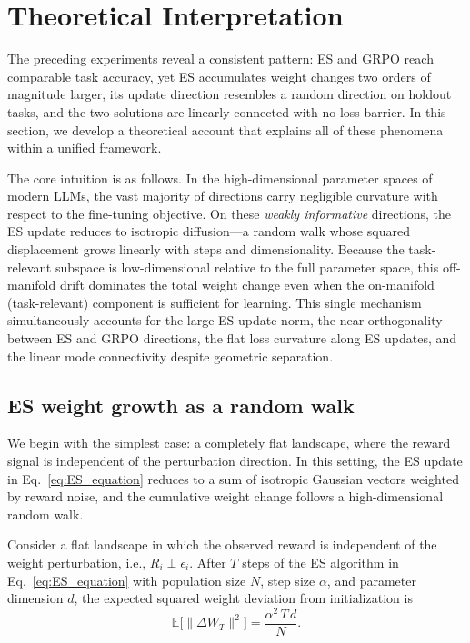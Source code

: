 \section{Theoretical Interpretation}
\label{sec:theory}

The preceding experiments reveal a consistent pattern: ES and GRPO reach comparable task accuracy, yet ES accumulates weight changes two orders of magnitude larger, its update direction resembles a random direction on holdout tasks, and the two solutions are linearly connected with no loss barrier. In this section, we develop a theoretical account that explains all of these phenomena within a unified framework.

The core intuition is as follows. In the high-dimensional parameter spaces of modern LLMs, the vast majority of directions carry negligible curvature with respect to the fine-tuning objective. On these \emph{weakly informative} directions, the ES update reduces to isotropic diffusion—a random walk whose squared displacement grows linearly with steps and dimensionality. Because the task-relevant subspace is low-dimensional relative to the full parameter space, this off-manifold drift dominates the total weight change even when the on-manifold (task-relevant) component is sufficient for learning. This single mechanism simultaneously accounts for the large ES update norm, the near-orthogonality between ES and GRPO directions, the flat loss curvature along ES updates, and the linear mode connectivity despite geometric separation.

\subsection{ES weight growth as a random walk}

We begin with the simplest case: a completely flat landscape, where the reward signal is independent of the perturbation direction. In this setting, the ES update in Eq.~\eqref{eq:ES_equation} reduces to a sum of isotropic Gaussian vectors weighted by reward noise, and the cumulative weight change follows a high-dimensional random walk.

\begin{proposition}
\label{prop:flat}
Consider a flat landscape in which the observed reward is independent of the weight perturbation, i.e., $R_i \perp \epsilon_i$. After $T$ steps of the ES algorithm in Eq.~\eqref{eq:ES_equation} with population size $N$, step size $\alpha$, and parameter dimension $d$, the expected squared weight deviation from initialization is
\[
\mathbb{E}\bigl[\|\Delta W_T\|^{2}\bigr] = \frac{\alpha^{2}\, T\, d}{N}.
\]
\end{proposition}

